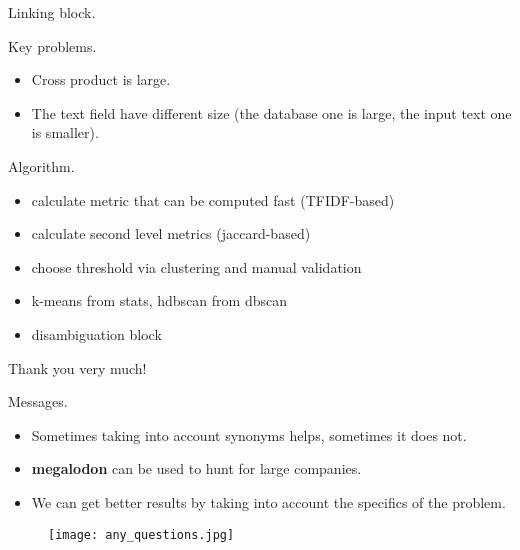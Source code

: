 \documentclass{beamer}
\begin{document}
\begin{frame}{Linking block.}
\begin{block}{Key problems.}
\begin{itemize}
\item Cross product is large.
\item The text field have different size (the database one is large, the input text one is smaller).
\end{itemize}
\end{block}
\begin{block}{Algorithm.}
\begin{itemize}
	\item calculate metric that can be computed fast (TFIDF-based)
	\item calculate second level metrics (jaccard-based)
	\item choose threshold via clustering and manual validation
	\item k-means from stats, hdbscan from dbscan
	\item disambiguation block
\end{itemize}
\end{block}
\end{frame}
\begin{frame}{Thank you very much!}
\begin{block}{Messages.}
\begin{itemize}
	\item Sometimes taking into account synonyms helps, sometimes it does not. 
	\item \textbf{megalodon} can be used to hunt for large companies.
	\item We can get better results by taking into account the specifics of the problem.
\end{itemize}
\end{block}
\begin{figure}[h!]
\centering
\texttt{[image: any\_questions.jpg]}
\end{figure}
\end{frame}
\end{document}
